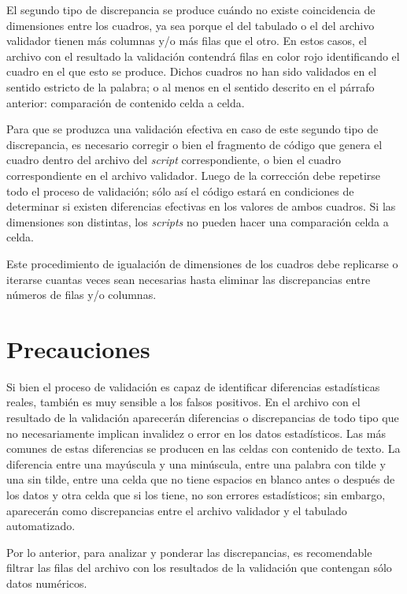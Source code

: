 \documentclass[
  spanish,
]{book}
\begin{document}
El segundo tipo de discrepancia se produce cuándo no existe coincidencia de dimensiones entre los cuadros, ya sea porque el del tabulado o el del archivo validador tienen más columnas y/o más filas que el otro. En estos casos, el archivo con el resultado la validación contendrá filas en color rojo identificando el cuadro en el que esto se produce. Dichos cuadros no han sido validados en el sentido estricto de la palabra; o al menos en el sentido descrito en el párrafo anterior: comparación de contenido celda a celda.

Para que se produzca una validación efectiva en caso de este segundo tipo de discrepancia, es necesario corregir o bien el fragmento de código que genera el cuadro dentro del archivo del \emph{script} correspondiente, o bien el cuadro correspondiente en el archivo validador. Luego de la corrección debe repetirse todo el proceso de validación; sólo así el código estará en condiciones de determinar si existen diferencias efectivas en los valores de ambos cuadros. Si las dimensiones son distintas, los \emph{scripts} no pueden hacer una comparación celda a celda.

Este procedimiento de igualación de dimensiones de los cuadros debe replicarse o iterarse cuantas veces sean necesarias hasta eliminar las discrepancias entre números de filas y/o columnas.

\hypertarget{precauciones}{%
\section{Precauciones}\label{precauciones}}

Si bien el proceso de validación es capaz de identificar diferencias estadísticas reales, también es muy sensible a los falsos positivos. En el archivo con el resultado de la validación aparecerán diferencias o discrepancias de todo tipo que no necesariamente implican invalidez o error en los datos estadísticos. Las más comunes de estas diferencias se producen en las celdas con contenido de texto. La diferencia entre una mayúscula y una minúscula, entre una palabra con tilde y una sin tilde, entre una celda que no tiene espacios en blanco antes o después de los datos y otra celda que si los tiene, no son errores estadísticos; sin embargo, aparecerán como discrepancias entre el archivo validador y el tabulado automatizado.

Por lo anterior, para analizar y ponderar las discrepancias, es recomendable filtrar las filas del archivo con los resultados de la validación que contengan sólo datos numéricos.
\end{document}
